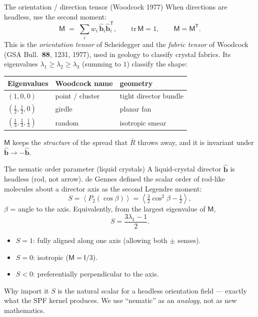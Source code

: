 \documentclass[aspectratio=169]{beamer}
\newcommand{\bb}{\hat{\bm b}}
\newcommand{\I}{\mathsf I}
\newcommand{\T}{\mathsf T}
\newcommand{\avg}[1]{\left\langle #1 \right\rangle}
\newcommand{\M}{\mathsf M}
\begin{document}
\begin{frame}[t]{The orientation / direction tensor (Woodcock 1977)}
When directions are headless, use the second moment:
\[
\M \;=\; \sum_i w_i\, \bb_i \bb_i^\T,
\qquad \mathrm{tr}\,\M = 1,
\qquad \M=\M^\T .
\]
This is the \emph{orientation tensor} of Scheidegger and the \emph{fabric tensor} of Woodcock (GSA Bull.\ \textbf{88}, 1231, 1977), used in geology to classify crystal fabrics. Its eigenvalues $\lambda_1\ge\lambda_2\ge\lambda_3$ (summing to $1$) classify the shape:
\renewcommand{\arraystretch}{1.1}
\begin{center}
\begin{tabular}{lll}
\toprule
Eigenvalues & Woodcock name & geometry \\
\midrule
$(1,0,0)$ & point / cluster & tight director bundle \\
$(\tfrac12,\tfrac12,0)$ & girdle & planar fan \\
$(\tfrac13,\tfrac13,\tfrac13)$ & random & isotropic smear \\
\bottomrule
\end{tabular}
\end{center}
$\M$ keeps the \emph{structure} of the spread that $\bar R$ throws away, and it is invariant under $\bb\to-\bb$.
\end{frame}

\begin{frame}[t]{The nematic order parameter (liquid crystals)}
A liquid-crystal director $\bb$ is headless (rod, not arrow). de Gennes defined the scalar order of rod-like molecules about a director axis as the second Legendre moment:
\[
S = \avg{P_2(\cos\beta)} = \avg{\tfrac{3}{2}\cos^2\beta - \tfrac12},
\]
$\beta$ = angle to the axis. Equivalently, from the largest eigenvalue of $\M$,
\[
S = \frac{3\lambda_1 - 1}{2}.
\]
\begin{itemize}
  \item $S=1$: fully aligned along one axis (allowing both $\pm$ senses).
  \item $S=0$: isotropic ($\M=\I/3$).
  \item $S<0$: preferentially perpendicular to the axis.
\end{itemize}
\begin{block}{Why import it}
$S$ is the natural scalar for a headless orientation field --- exactly what the SPF kernel produces. We use ``nematic'' as an \emph{analogy}, not as new mathematics.
\end{block}
\end{frame}
\end{document}
